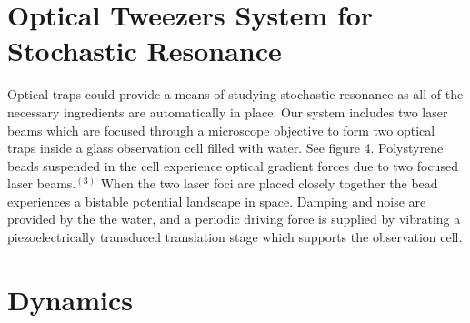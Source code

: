 \documentclass{report}
\begin{document}
\section{Optical Tweezers System for Stochastic Resonance}

Optical traps could provide a means of studying stochastic resonance as all of the necessary ingredients are automatically in place. Our system includes two laser beams which are focused through a microscope objective to form two optical traps inside a glass observation cell filled with water. See figure 4. Polystyrene beads suspended in the cell experience optical gradient forces due to two focused laser beams.$^{(3)}$ When the two laser foci are placed closely together the bead experiences a bistable potential landscape in space. Damping and noise are provided by the the water, and a periodic driving force is supplied by vibrating a piezoelectrically transduced translation stage which supports the observation cell.

\section{Dynamics}
\end{document}
